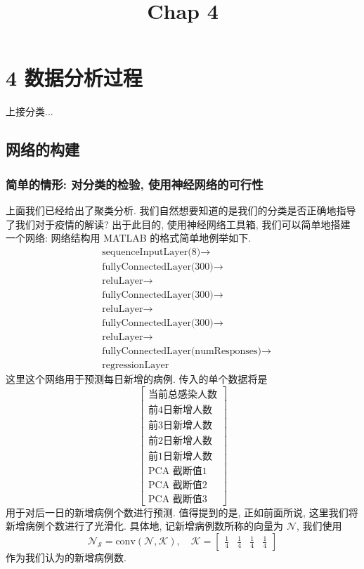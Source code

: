 \documentclass[UTF8]{ctexart}
\title{Chap 4}
\author{}
\date{}
\begin{document}
	\maketitle
    \section*{4 数据分析过程}
	上接分类...

    \subsection*{网络的构建}
	\subsubsection*{简单的情形: 对分类的检验, 使用神经网络的可行性}
	上面我们已经给出了聚类分析. 我们自然想要知道的是我们的分类是否正确地指导了我们对于疫情的解读? 出于此目的, 使用神经网络工具箱, 我们可以简单地搭建一个网络: 网络结构用 MATLAB 的格式简单地例举如下.
	\begin{align*}
		&\text{sequenceInputLayer(8)} \rightarrow \\
    	&\text{fullyConnectedLayer(300)} \rightarrow \\
    	&\text{reluLayer} \rightarrow \\
    	&\text{fullyConnectedLayer(300)} \rightarrow \\
    	&\text{reluLayer} \rightarrow \\
    	&\text{fullyConnectedLayer(300)} \rightarrow \\
    	&\text{reluLayer} \rightarrow \\
    	&\text{fullyConnectedLayer(numResponses)} \rightarrow \\
    	&\text{regressionLayer}
	\end{align*}
	这里这个网络用于预测每日新增的病例. 传入的单个数据将是
	\[
	\begin{bmatrix}
		\text{当前总感染人数}\\
		\text{前4日新增人数}\\
		\text{前3日新增人数}\\
		\text{前2日新增人数}\\
		\text{前1日新增人数}\\
		\text{PCA 截断值1}\\
		\text{PCA 截断值2}\\
		\text{PCA 截断值3}
	\end{bmatrix}
	\]
	用于对后一日的新增病例个数进行预测. 值得提到的是, 正如前面所说, 这里我们将新增病例个数进行了光滑化. 具体地, 记新增病例数所称的向量为 $\mathcal{N}$, 我们使用
	\[
		\mathcal{N}_{\mathcal{S}} = \text{conv}(\mathcal{N},\mathcal{K}), \quad \mathcal{K} = \begin{bmatrix}
			\displaystyle\frac{1}{4}&\displaystyle\frac{1}{4}&\displaystyle\frac{1}{4}&\displaystyle\frac{1}{4}
	\end{bmatrix}
	\]
	作为我们认为的新增病例数.
\end{document}
